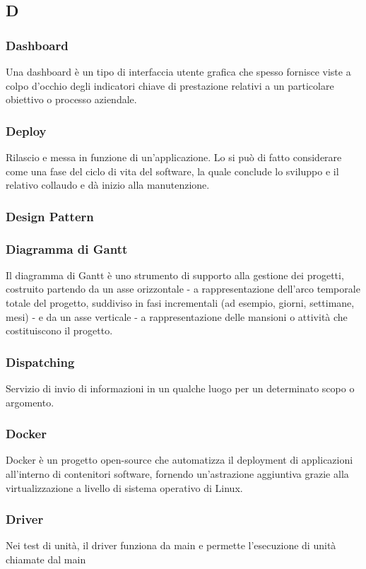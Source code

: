 \subsection*{\textbf{\hfill \Huge{D} \hfill}} 
\subsubsection*{Dashboard}
Una dashboard è un tipo di interfaccia utente grafica che spesso fornisce viste a colpo d’occhio degli indicatori chiave di prestazione relativi a un particolare obiettivo o processo aziendale.
\subsubsection*{Deploy}
Rilascio e messa in funzione di un'applicazione. Lo si può di fatto considerare come una fase del ciclo di vita del software, la quale conclude lo sviluppo e il relativo collaudo e dà inizio alla manutenzione.
\subsubsection*{Design Pattern}

\subsubsection*{Diagramma di Gantt}
Il diagramma di Gantt è uno strumento di supporto alla gestione dei progetti, costruito partendo da un asse orizzontale - a rappresentazione dell'arco temporale totale del progetto, suddiviso in fasi incrementali (ad esempio, giorni, settimane, mesi) - e da un asse verticale - a rappresentazione delle mansioni o attività che costituiscono il progetto.
\subsubsection*{Dispatching}
Servizio di invio di informazioni in un qualche luogo per un determinato scopo o argomento.
\subsubsection*{Docker}
Docker è un progetto open-source che automatizza il deployment di applicazioni all'interno di contenitori software, fornendo un'astrazione aggiuntiva grazie alla virtualizzazione a livello di sistema operativo di Linux.
\subsubsection*{Driver}
Nei test di unità, il driver funziona da main e permette l'esecuzione di unità chiamate dal main
